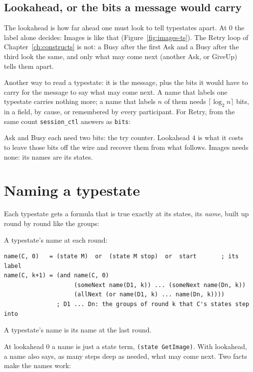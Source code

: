 \subsection{Lookahead, or the bits a message would carry}

The lookahead is how far ahead one must look to tell typestates apart. At $0$ the label
alone decides: Images is like that (Figure~\ref{fig:images-ts}). The Retry loop of
Chapter~\ref{ch:constructs} is not: a Busy after the first Ask and a Busy after the third
look the same, and only what may come next (another Ask, or GiveUp) tells them apart.

Another way to read a typestate: it is the message, plus the bits it would have to carry
for the message to say what may come next. A name that labels one typestate carries nothing
more; a name that labels $n$ of them needs $\lceil \log_2 n \rceil$ bits, in a field, by
cause, or remembered by every participant. For Retry, from the same count \texttt{session\_ctl}
answers as \texttt{bits}:
\begin{center}
\end{center}
Ask and Busy each need two bits: the try counter. Lookahead $4$ is what it costs to leave
those bits off the wire and recover them from what follows. Images needs none: its names are
its states.

\section{Naming a typestate}

Each typestate gets a formula that is true exactly at its states, its \emph{name}, built up
round by round like the groups:

\begin{definition}[Names]\label{def:chi}
A typestate's name at each round:
\begin{lstlisting}[language={},basicstyle=\ttfamily\footnotesize]
name(C, 0)   = (state M)  or  (state M stop)  or  start       ; its label
name(C, k+1) = (and name(C, 0)
                    (someNext name(D1, k)) ... (someNext name(Dn, k))
                    (allNext (or name(D1, k) ... name(Dn, k))))
               ; D1 ... Dn: the groups of round k that C's states step into
\end{lstlisting}
A typestate's name is its name at the last round.
\end{definition}

At lookahead $0$ a name is just a state term, \texttt{(state GetImage)}. With lookahead, a
name also says, as many steps deep as needed, what may come next. Two facts make the names
work:

